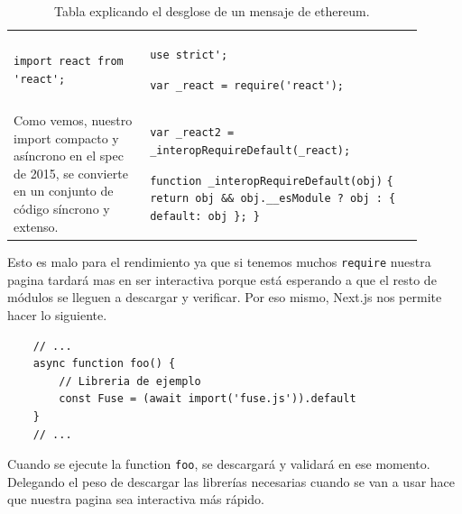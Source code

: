 \begin{center}
    \begin{table}[h!]
        \begin{tabular}{p{0.3\linewidth}  p{0.6\linewidth}}
                \verb|import react from 'react';|
            & 
\verb|use strict';|

\verb|var _react = require('react');|
             \\
            Como vemos, nuestro import compacto y asíncrono en el spec de 2015, se convierte en un conjunto de código síncrono y extenso. & 
\verb|var _react2 = _interopRequireDefault(_react);|

\verb|function _interopRequireDefault(obj)|
\verb|{ return obj && obj.__esModule ? obj : { default: obj }; }|

\\
        \end{tabular}
        \label{tab:EC6_output}
        \caption{Tabla explicando el desglose de un mensaje de ethereum.}
    \end{table}
\end{center}
Esto es malo para el rendimiento ya que si tenemos muchos \verb|require| nuestra pagina tardará mas en ser interactiva porque está esperando a que el resto de módulos se lleguen a descargar y verificar.
Por eso mismo, Next.js \cite{web:next.js} nos permite hacer lo siguiente.
\begin{lstlisting}
    // ...
    async function foo() {
        // Libreria de ejemplo
        const Fuse = (await import('fuse.js')).default
    }
    // ...
\end{lstlisting}
Cuando se ejecute la function \verb|foo|, se descargará y validará en ese momento. Delegando el peso de descargar las librerías necesarias cuando se van a usar hace que nuestra pagina sea interactiva más rápido.
